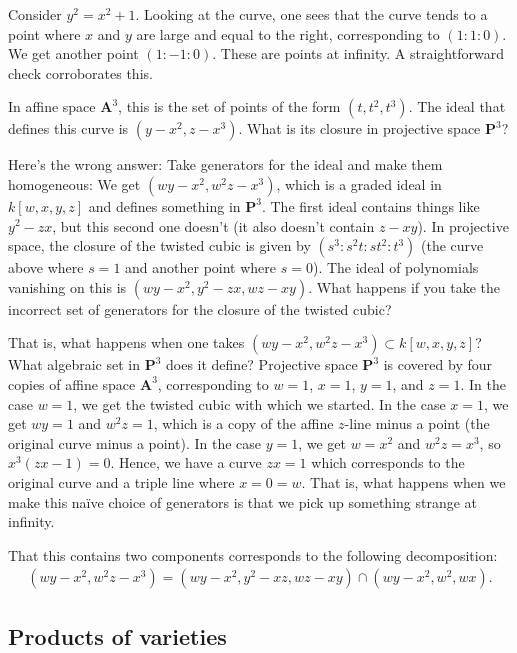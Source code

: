 \documentclass[11pt, oneside,margin=1in]{article}
\begin{document}
\begin{example}[ ]\label{}\text{}
Consider $y^2 = x^2 + 1$. Looking at the curve, one sees that the curve tends to a point where $x$ and $y$ are large and equal to the right, corresponding to $(1:1:0)$. We get another point $(1:-1:0)$. These are points at infinity. A straightforward check corroborates this. 
\end{example}

\begin{example}\label{}\text{}
In affine space $\mathbf{A}^3$, this is the set of points of the form $(t,t^2,t^3)$. The ideal that defines this curve is $(y-x^2, z-x^3)$. What is its closure in projective space $\mathbf{P}^3$?

Here's the wrong answer: Take generators for the ideal and make them homogeneous: We get $ (wy-x^2,w^2z-x^3)$, which is a graded ideal in $k[w,x,y,z]$ and defines something in $\mathbf{P}^3$. The first ideal contains things like $y^2-zx$, but this second one doesn't (it also doesn't contain $z-xy$). In projective space, the closure of the twisted cubic is given by $(s^3:s^2t:st^2:t^3)$ (the curve above where $s=1$ and another point where $s=0$). The ideal of polynomials vanishing on this is $(wy-x^2, y^2-zx, wz- xy)$. What happens if you take the incorrect set of generators for the closure of the twisted cubic?

That is, what happens when one takes $(wy-x^2, w^2z - x^3) \subset k[w,x,y,z]$? What algebraic set in $\mathbf{P}^3$ does it define? Projective space $\mathbf{P}^3$ is covered by four copies of affine space $\mathbf{A}^3$, corresponding to $w=1$, $x=1$, $y=1$, and $z=1$. In the case $w=1$, we get the twisted cubic with which we started. In the case $x=1$, we get $wy=1$ and $w^2z = 1$, which is a copy of the affine $z$-line minus a point (the original curve minus a point). In the case $y=1$, we get $w=x^2$ and $w^2z=x^3$, so $x^3(zx-1)=0$. Hence, we have a curve $zx=1$ which corresponds to the original curve and a triple line where $x=0=w$. That is, what happens when we make this na\"ive choice of generators is that we pick up something strange at infinity.

That this contains two components corresponds to the following decomposition:
\begin{align*}
	(wy-x^2, w^2z - x^3) = (wy-x^2,y^2-xz, wz-xy) \cap  (wy-x^2, w^2, wx).
\end{align*}
\end{example}


\subsection{Products of varieties}
\end{document}

